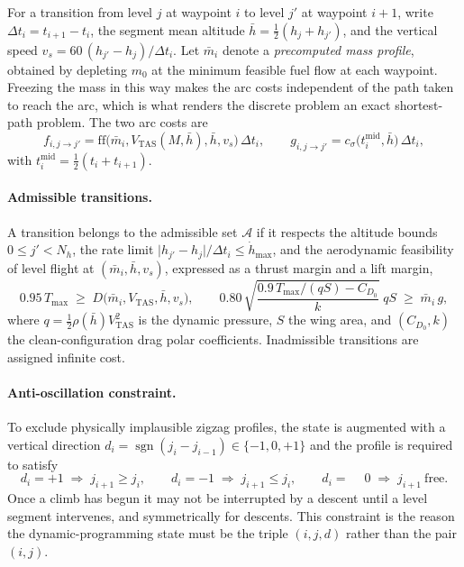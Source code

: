 For a transition from level $j$ at waypoint $i$ to level $j'$ at waypoint $i+1$,
write $\Delta t_i=t_{i+1}-t_i$, the segment mean altitude
$\bar h=\tfrac12(h_j+h_{j'})$, and the vertical speed
$v_s = 60\,(h_{j'}-h_j)/\Delta t_i$. Let $\bar m_i$ denote a \emph{precomputed
mass profile}, obtained by depleting $m_0$ at the minimum feasible fuel flow at
each waypoint. Freezing the mass in this way makes the arc costs independent of
the path taken to reach the arc, which is what renders the discrete problem an
exact shortest-path problem. The two arc costs are
%
\begin{equation}
  f_{i,j\to j'} = \mathrm{ff}\bigl(\bar m_i, V_{\mathrm{TAS}}(M,\bar h),
  \bar h, v_s\bigr)\,\Delta t_i,
  \qquad
  g_{i,j\to j'} = c_\sigma\bigl(t_i^{\mathrm{mid}},\bar h\bigr)\,\Delta t_i,
  \label{eq:arc-costs}
\end{equation}
%
with $t_i^{\mathrm{mid}}=\tfrac12(t_i+t_{i+1})$.

\paragraph{Admissible transitions.}
A transition belongs to the admissible set $\mathcal{A}$ if it respects the
altitude bounds $0\le j'<N_h$, the rate limit
$\lvert h_{j'}-h_j\rvert/\Delta t_i \le \dot h_{\max}$, and the aerodynamic
feasibility of level flight at $(\bar m_i,\bar h,v_s)$, expressed as a thrust
margin and a lift margin,
%
\begin{equation}
  0.95\,T_{\max} \;\ge\; D\bigl(\bar m_i,V_{\mathrm{TAS}},\bar h,v_s\bigr),
  \qquad
  0.80\,\sqrt{\frac{0.9\,T_{\max}/(qS)-C_{D_0}}{k}}\;qS
  \;\ge\; \bar m_i\,g,
  \label{eq:feasibility}
\end{equation}
%
where $q=\tfrac12\rho(\bar h)V_{\mathrm{TAS}}^2$ is the dynamic pressure, $S$
the wing area, and $(C_{D_0},k)$ the clean-configuration drag polar
coefficients. Inadmissible transitions are assigned infinite cost.

\paragraph{Anti-oscillation constraint.}
To exclude physically implausible zigzag profiles, the state is augmented with a
vertical direction $d_i=\operatorname{sgn}(j_i-j_{i-1})\in\{-1,0,+1\}$ and the
profile is required to satisfy
%
\begin{equation}
  d_i=+1 \;\Rightarrow\; j_{i+1}\ge j_i, \qquad
  d_i=-1 \;\Rightarrow\; j_{i+1}\le j_i, \qquad
  d_i=\phantom{+}0 \;\Rightarrow\; j_{i+1}\ \text{free}.
  \label{eq:antiosc}
\end{equation}
%
Once a climb has begun it may not be interrupted by a descent until a level
segment intervenes, and symmetrically for descents. This constraint is the
reason the dynamic-programming state must be the triple $(i,j,d)$ rather than
the pair $(i,j)$.

